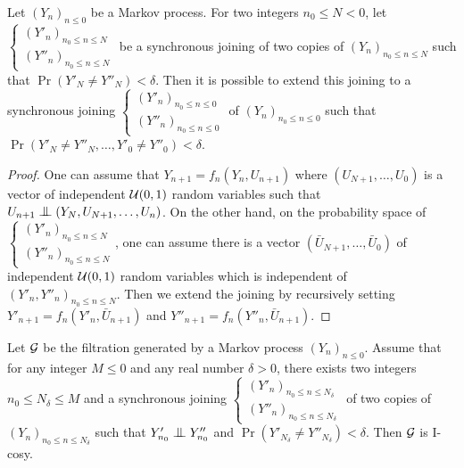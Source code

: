 \documentclass[12pt,a4paper]{article}
\begin{document}
\begin{lemma}\label{lemma:extendjoining}
Let ${(Y_n)}_{n \leq 0}$ be a Markov process. 
For two integers $n_0 \leq N < 0$, let 
$\left\{\begin{smallmatrix} {(Y'_n)}_{n_0 \leq n \leq N} \\ 
{(Y''_n)}_{n_0 \leq n \leq N}
\end{smallmatrix}\right.$ be a synchronous joining of two copies of  
${(Y_n)}_{n_0 \leq n \leq N}$ such that 
$\Pr(Y'_N \neq Y''_N) < \delta$. 
Then it is possible to extend this joining to 
a synchronous joining 
$\left\{\begin{smallmatrix} {(Y'_n)}_{n_0 \leq n \leq 0} \\ 
{(Y''_n)}_{n_0 \leq n \leq 0}
\end{smallmatrix}\right.$ 
of ${(Y_n)}_{n_0 \leq n \leq 0}$ such that 
$\Pr(Y'_N \neq Y''_N, \ldots, Y'_0 \neq Y''_0) < \delta$.
\end{lemma}

\begin{proof}
One can assume that $Y_{n+1} = f_n(Y_n, U_{n+1})$ where 
$(U_{N+1}, \ldots, U_0)$ is a vector of independent $\mathcal{U}(0,1)$ random variables 
such that 
$U_{n+1} \indep (Y_{N}, U_{N+1}, \ldots, U_n)$. 
On the other hand, on the probability space of 
$\left\{\begin{smallmatrix} {(Y'_n)}_{n_0 \leq n \leq N} \\ 
{(Y''_n)}_{n_0 \leq n \leq N}
\end{smallmatrix}\right.$, one can assume there is a vector  
$(\bar U_{N+1}, \ldots, \bar U_0)$ of independent $\mathcal{U}(0,1)$ random variables 
which is 
independent of ${(Y'_n, Y''_n)}_{n_0 \leq n \leq N}$. 
Then we extend the joining by recursively setting 
$Y'_{n+1} = f_n(Y'_n, \bar U_{n+1})$ and $Y''_{n+1} = f_n(Y''_n, \bar U_{n+1})$.
\end{proof}

\begin{lemma}\label{lemma:markovcosy}
Let $\mathcal{G}$ be the filtration generated by a Markov process ${(Y_n)}_{n \leq 0}$. 
Assume that for any integer $M \leq 0$ and any real number $\delta >0$, 
there exists two integers $n_0 \leq N_\delta \leq M$ and a synchronous joining 
$\left\{\begin{smallmatrix} {(Y'_n)}_{n_0 \leq n \leq N_\delta} \\ 
{(Y''_n)}_{n_0 \leq n \leq N_\delta}
\end{smallmatrix}\right.$  of two copies of  
${(Y_n)}_{n_0 \leq n \leq N_\delta}$ such that 
$Y'_{n_0} \indep Y''_{n_0}$ and $\Pr(Y'_{N_\delta} \neq Y''_{N_\delta}) < \delta$.  
Then $\mathcal{G}$ is I-cosy.
\end{lemma}
\end{document}
